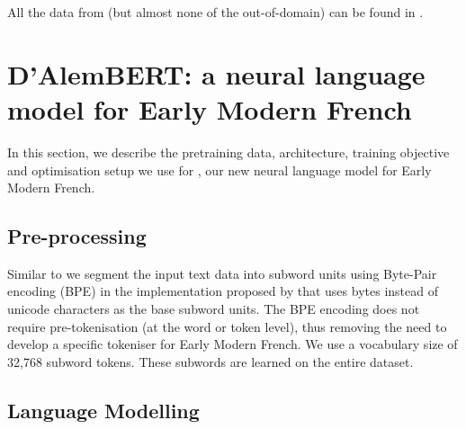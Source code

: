 All the data from \freemlpm (but almost none of the out-of-domain) can be found in \freemmax.

\section{D'AlemBERT: a neural language model for Early Modern French}\label{sec:dAlemBERT}
In this section, we describe the pretraining data, architecture, training objective and optimisation setup we use for \dalembert, our new neural language model for Early Modern French.


\subsection{Pre-processing}
Similar to \roberta \cite{liu-etal-2019-roberta} we segment the input text data into subword units using Byte-Pair encoding (BPE) \cite{sennrich-etal-2016-neural} in the implementation proposed by \cite{radford-etal-2019-language} that uses bytes instead of unicode characters as the base subword units. The BPE encoding does not require pre-tokenisation (at the word or token level), thus removing the need to develop a specific tokeniser for Early Modern French. We use a vocabulary size of 32,768 subword tokens. These subwords are learned on the entire \freemmax dataset.


\subsection{Language Modelling}

